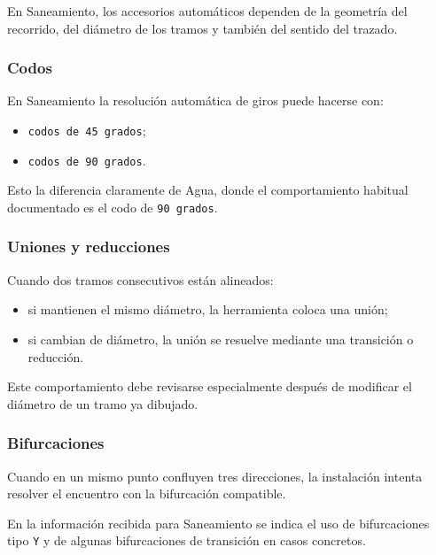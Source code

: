 En Saneamiento, los accesorios automáticos dependen de la geometría del recorrido, del diámetro de los tramos y también del sentido del trazado.

\subsubsection{Codos}

En Saneamiento la resolución automática de giros puede hacerse con:

\begin{itemize}
\item \texttt{codos de 45 grados};
\item \texttt{codos de 90 grados}.
\end{itemize}

Esto la diferencia claramente de Agua, donde el comportamiento habitual documentado es el codo de \texttt{90 grados}.


\subsubsection{Uniones y reducciones}

Cuando dos tramos consecutivos están alineados:

\begin{itemize}
\item si mantienen el mismo diámetro, la herramienta coloca una unión;
\item si cambian de diámetro, la unión se resuelve mediante una transición o reducción.
\end{itemize}

Este comportamiento debe revisarse especialmente después de modificar el diámetro de un tramo ya dibujado.

\subsubsection{Bifurcaciones}

Cuando en un mismo punto confluyen tres direcciones, la instalación intenta resolver el encuentro con la bifurcación compatible.

En la información recibida para Saneamiento se indica el uso de bifurcaciones tipo \texttt{Y} y de algunas bifurcaciones de transición en casos concretos.

